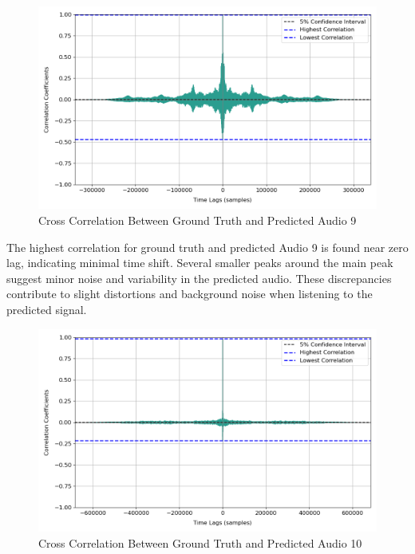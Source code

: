 \documentclass{ioereport}
\begin{document}
    \begin{figure}[H]
        \centering
        \includegraphics[width=\linewidth]{assets/crosscorrelation/cross_correlation_06seconds_06secondspred.png}
        \caption{Cross Correlation Between Ground Truth and Predicted Audio 9}
        \label{fig:cross-correlation-9}
    \end{figure}

    The highest correlation for ground truth and predicted Audio 9 is found near zero lag, indicating minimal time shift. Several smaller peaks around the main peak suggest minor noise and variability in the predicted audio. These discrepancies contribute to slight distortions and background noise when listening to the predicted signal.

    \begin{figure}[H]
        \centering
        \includegraphics[width=\linewidth]{assets/crosscorrelation/cross_correlation_12seconds_12secondspred.png}
        \caption{Cross Correlation Between Ground Truth and Predicted Audio 10}
        \label{fig:cross-correlation-10}
    \end{figure}
\end{document}
